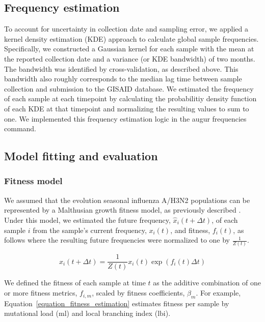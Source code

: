 \subsection*{Frequency estimation}

To account for uncertainty in collection date and sampling error, we applied a kernel density estimation (KDE) approach to calculate global sample frequencies.
Specifically, we constructed a Gaussian kernel for each sample with the mean at the reported collection date and a variance (or KDE bandwidth) of two months.
The bandwidth was identified by cross-validation, as described above.
This bandwidth also roughly corresponds to the median lag time between sample collection and submission to the GISAID database.
We estimated the frequency of each sample at each timepoint by calculating the probabilitiy density function of each KDE at that timepoint and normalizing the resulting values to sum to one.
We implemented this frequency estimation logic in the augur frequencies command.

\subsection*{Model fitting and evaluation}

\subsubsection*{Fitness model}

We assumed that the evolution seasonal influenza A/H3N2 populations can be represented by a Malthusian growth fitness model, as previously described \cite{Luksza:2014hj}.
Under this model, we estimated the future frequency, $\hat{x}_{i}(t + \Delta{t})$, of each sample $i$ from the sample's current frequency, $x_{i}(t)$, and fitness, $f_{i}(t)$, as follows where the resulting future frequencies were normalized to one by $\frac{1}{Z(t)}$.

\begin{equation}
    \hat{x}_{i}(t + \Delta{t}) = \frac{1}{Z(t)}x_{i}(t)\exp(f_{i}(t)\Delta{t})
    \label{equation_exponential_growth_model}
\end{equation}

We defined the fitness of each sample at time $t$ as the additive combination of one or more fitness metrics, $f_{i,m}$, scaled by fitness coefficients, $\beta_{m}$.
For example, Equation~\ref{equation_fitness_estimation} estimates fitness per sample by mutational load ($\mathrm{ml}$) and local branching index ($\mathrm{lbi}$).


